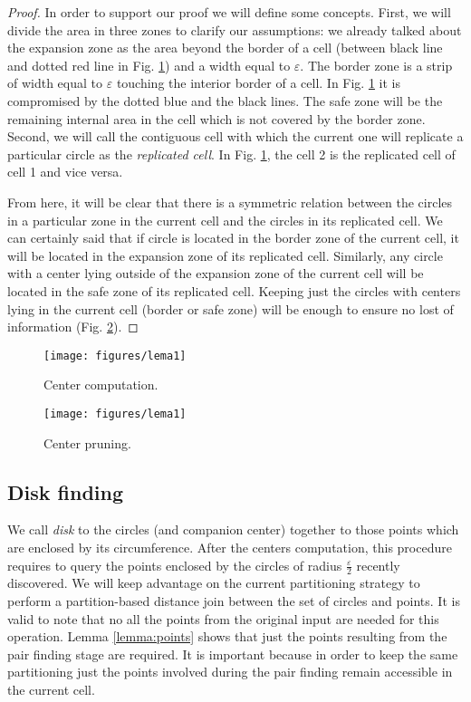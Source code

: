 \documentclass[twocolumn]{IEEEtran}
\begin{document}
\begin{proof}
  In order to support our proof we will define some concepts.  First, we will divide the area in three zones to clarify our assumptions:  we already talked about the expansion zone as the area beyond the border of a cell (between black line and dotted red line in Fig. \ref{fig:centers}) and a width equal to $\varepsilon$.  The border zone is a strip of width equal to $\varepsilon$ touching the interior border of a cell.  In Fig. \ref{fig:centers} it is compromised by the dotted blue and the black lines.  The safe zone will be the remaining internal area in the cell which is not covered by the border zone.  Second, we will call the contiguous cell with which the current one will replicate a particular circle as the \textit{replicated cell}. In Fig. \ref{fig:centers}, the cell 2 is the replicated cell of cell 1 and vice versa.

  From here, it will be clear that there is a symmetric relation between the circles in a particular zone in the current cell and the circles in its replicated cell.  We can certainly said that if circle is located in the border zone of the current cell, it will be located in the expansion zone of its replicated cell.  Similarly, any circle with a center lying outside of the expansion zone of the current cell will be located in the safe zone of its replicated cell.  Keeping just the circles with centers lying in the current cell (border or safe zone) will be enough to ensure no lost of information (Fig. \ref{fig:centerspruning}).
\end{proof}

\begin{figure}[htbp]
  \centering
  \texttt{[image: figures/lema1]}
  \caption{Center computation.}
  \label{fig:centers}
\end{figure}

\begin{figure}[htbp]
  \centering
    \texttt{[image: figures/lema1]}
  \caption{Center pruning.}
  \label{fig:centerspruning}
\end{figure}

\subsection*{Disk finding}
We call \textit{disk} to the circles (and companion center) together to those points which are enclosed by its circumference.  After the centers computation, this procedure requires to query the points enclosed by the circles of radius $\frac{\varepsilon}{2}$ recently discovered.  We will keep advantage on the current partitioning strategy to perform a partition-based distance join between the set of circles and points.  It is valid to note that no all the points from the original input are needed for this operation.  Lemma \ref{lemma:points} shows that just the points resulting from the pair finding stage are required.  It is important because in order to keep the same partitioning just the points involved during the pair finding remain accessible in the current cell.
\end{document}
